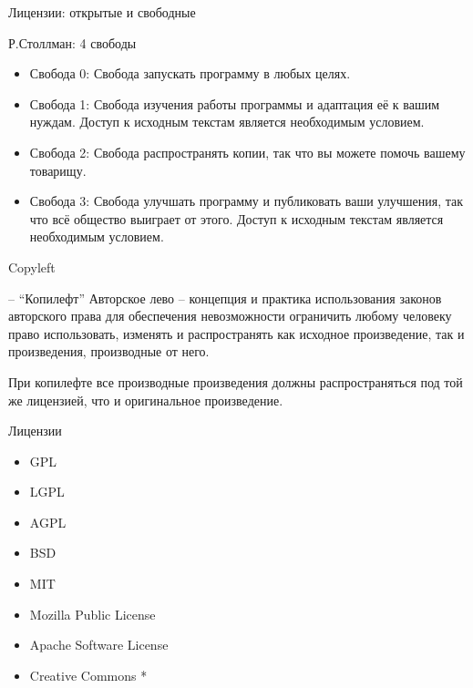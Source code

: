\begin{frame}{Лицензии: открытые и свободные}

	\begin{block}{ Р.Столлман: 4 свободы}

		\begin{itemize}
			\item Свобода 0: Свобода запускать программу в любых целях.
			\item Свобода 1: Свобода изучения работы программы и адаптация её к вашим нуждам. 
				Доступ к исходным текстам является необходимым условием.
			\item Свобода 2: Свобода распространять копии,  так что вы можете помочь вашему товарищу.
			\item Свобода 3: Свобода улучшать программу и публиковать ваши улучшения,
				так что всё общество выиграет от этого.
				Доступ к исходным текстам является необходимым условием.
		\end{itemize}
	\end{block}


\end{frame}

\begin{frame}{Copyleft }

	\begin{block}{ \textcopyleft  -- ``Копилефт''}
	Авторское лево -- концепция и практика использования законов авторского права для обеспечения 
	невозможности ограничить любому человеку право использовать,  изменять и распространять как 
	исходное произведение,  так и произведения,  производные от него.
	\end{block}


	При копилефте все производные произведения должны распространяться под той же лицензией,
	что и оригинальное произведение.

\end{frame}


\begin{frame}{Лицензии}
	\begin{itemize}
		\item GPL
		\item LGPL
		\item AGPL
		\item BSD
		\item MIT
		\item Mozilla Public License
		\item Apache Software License
		\item Creative Commons *
	\end{itemize}
\end{frame}
